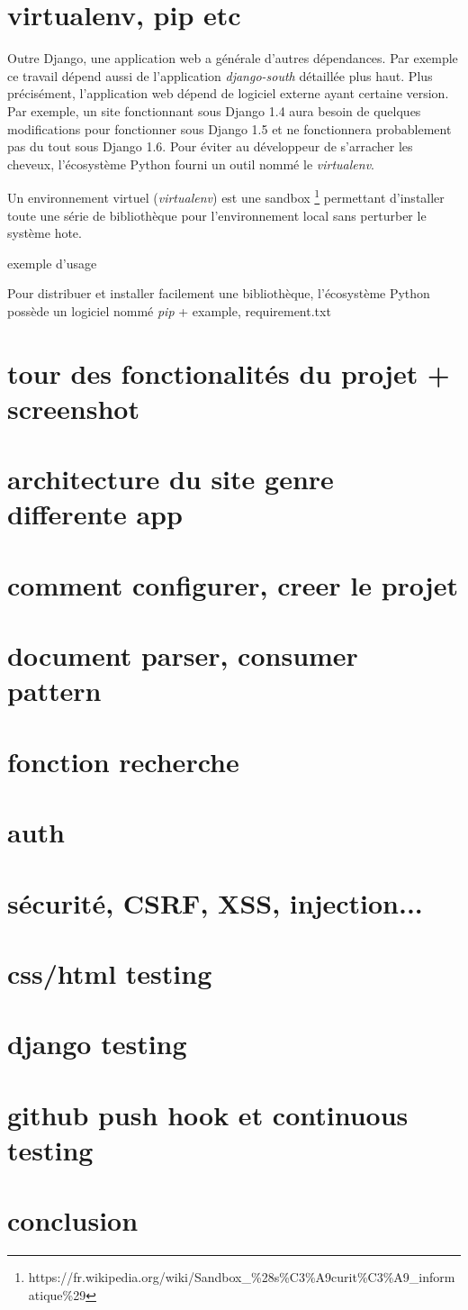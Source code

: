 \documentclass[a4paper,12pt]{article}
\begin{document}
\section{virtualenv, pip etc}

Outre Django, une application web a générale d'autres dépendances. Par exemple
ce travail dépend aussi de l'application \textit{django-south} détaillée plus haut.
Plus précisément, l'application web dépend de logiciel externe ayant certaine version.
Par exemple, un site fonctionnant sous Django 1.4 aura besoin de quelques modifications
pour fonctionner sous Django 1.5 et ne fonctionnera probablement pas du tout sous
Django 1.6. Pour éviter au développeur de s'arracher les cheveux, l'écosystème Python
fourni un outil nommé le \textit{virtualenv}.

Un environnement virtuel (\textit{virtualenv}) est une sandbox
\footnote{https://fr.wikipedia.org/wiki/Sandbox\_\%28s\%C3\%A9curit\%C3\%A9\_informatique\%29}
permettant d'installer toute une série de bibliothèque pour l'environnement
local sans perturber le système hote.

exemple d'usage

Pour distribuer et installer facilement une bibliothèque, l'écosystème Python
possède un logiciel nommé \textit{pip} + example, requirement.txt


\section{tour des fonctionalités du projet + screenshot}
\section{architecture du site genre differente app}
\section{comment configurer, creer le projet}
\section{document parser, consumer pattern}
\section{fonction recherche}
\section{auth}
\section{sécurité, CSRF, XSS, injection...}
\section{css/html testing}
\section{django testing}
\section{github push hook et continuous testing}
\section{conclusion}
\end{document}
